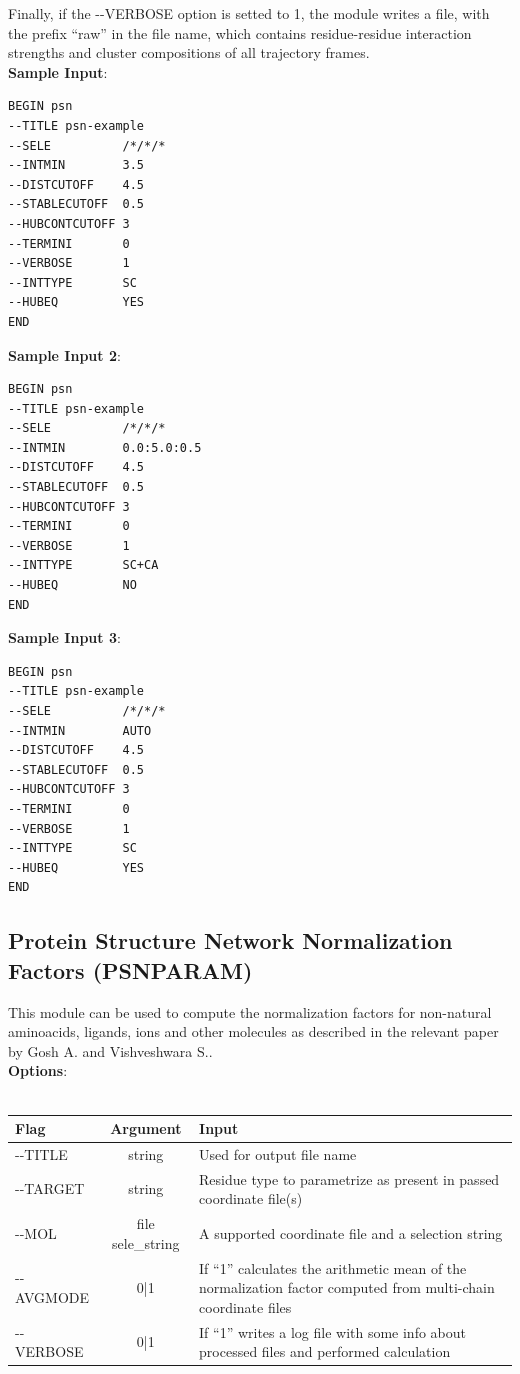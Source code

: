 \documentclass[11pt,twoside,onecolumn,a4paper,openright,notitlepage]{book}[2001/04/21]
\begin{document}
Finally, if the -{}-VERBOSE option is setted to 1, the module writes a file, with the prefix ``raw'' in the file name, which contains residue-residue interaction strengths and cluster compositions of all trajectory frames.\\

\textbf{\large Sample Input}:
\begin{verbatim}
BEGIN psn
--TITLE psn-example
--SELE          /*/*/*
--INTMIN        3.5
--DISTCUTOFF    4.5
--STABLECUTOFF  0.5
--HUBCONTCUTOFF 3
--TERMINI       0
--VERBOSE       1
--INTTYPE       SC
--HUBEQ         YES
END
\end{verbatim}


\textbf{\large Sample Input 2}:
\begin{verbatim}
BEGIN psn
--TITLE psn-example
--SELE          /*/*/*
--INTMIN        0.0:5.0:0.5
--DISTCUTOFF    4.5
--STABLECUTOFF  0.5
--HUBCONTCUTOFF 3
--TERMINI       0
--VERBOSE       1
--INTTYPE       SC+CA
--HUBEQ         NO
END
\end{verbatim}

\textbf{\large Sample Input 3}:
\begin{verbatim}
BEGIN psn
--TITLE psn-example
--SELE          /*/*/*
--INTMIN        AUTO
--DISTCUTOFF    4.5
--STABLECUTOFF  0.5
--HUBCONTCUTOFF 3
--TERMINI       0
--VERBOSE       1
--INTTYPE       SC
--HUBEQ         YES
END
\end{verbatim}

\subsection{Protein Structure Network Normalization Factors (PSNPARAM)}
This module can be used to compute the normalization factors for non-natural aminoacids, ligands, ions and other molecules as described in the relevant paper by Gosh A. and Vishveshwara S.\cite{ghosh2007study}.\\

\textbf{\large Options}:\\\\
\begin{longtable}{l|c|p{7.0cm}}
\bf{Flag} & \bf{Argument} & \bf{Input}\\
\hline\endhead
-{}-TITLE         & string              & Used for output file name\\
-{}-TARGET        & string              & Residue type to parametrize as present in passed coordinate file(s)\\
-{}-MOL           & file sele\_string   & A supported coordinate file and a selection string\\
-{}-AVGMODE       & 0|1                 & If ``1'' calculates the arithmetic mean of the normalization factor computed from multi-chain coordinate files\\
-{}-VERBOSE       & 0|1                 & If ``1'' writes a log file with some info about processed files and performed calculation\\
\end{longtable}
\end{document}
